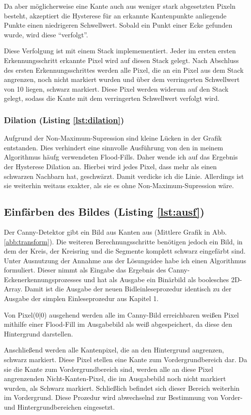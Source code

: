 Da aber möglicherweise eine Kante auch aus weniger stark abgesetzten Pixeln besteht, akzeptiert die Hysterese für an erkannte Kantenpunkte anliegende Punkte einen niedrigeren Schwellwert. Sobald ein Punkt einer Ecke gefunden wurde, wird diese "`verfolgt"'.

Diese Verfolgung ist mit einem Stack implemementiert. Jeder im ersten ersten Erkennungsschritt erkannte Pixel wird auf diesen Stack gelegt. Nach Abschluss des ersten Erkennungsschrittes werden alle Pixel, die an ein Pixel aus dem Stack angrenzen, noch nicht markiert wurden und über dem verringerten Schwellwert von 10 liegen, schwarz markiert. Diese Pixel werden widerum auf den Stack gelegt, sodass die Kante mit dem verringerten Schwellwert verfolgt wird. 

\subsubsection{Dilation (Listing \ref{lst:dilation})}
Aufgrund der Non-Maximum-Supression sind kleine Lücken in der Grafik entstanden. Dies verhindert eine sinnvolle Ausführung von den in meinem Algorithmus häufg verwendeten Flood-Fills. Daher wende ich auf das Ergebnis der Hysterese Dilation an. Hierbei wird jedes Pixel, dass mehr als einen schwarzen Nachbarn hat, geschwärzt.
Damit verdicke ich die Linie. Allerdings ist sie weiterhin weitaus exakter, als sie es ohne Non-Maximum-Supression wäre.

\subsection{Einfärben des Bildes (Listing \ref{lst:ausf})}
Der Canny-Detektor gibt ein Bild aus Kanten aus (Mittlere Grafik in Abb. \ref{abb:transform}). Die weiteren Berechnungsschritte benötigen jedoch ein Bild, in dem der Kreis, der Kreisring und die Segmente komplett schwarz eingefärbt sind. Unter Ausnutzung der Annahme aus der Lösungsidee habe ich einen Algorithmus formuliert.
Dieser nimmt als Eingabe das Ergebnis des Canny-Eckenerkennungsprozesses und hat als Ausgabe ein Binärbild als boolesches 2D-Array. Damit ist die Ausgabe der neuen Bidleinleseprozedur identisch zu der Ausgabe der simplen Einleseprozedur aus Kapitel 1.

Von Pixel(0|0) ausgehend werden alle im Canny-Bild erreichbaren weißen Pixel mithilfe einer Flood-Fill im Ausgabebild als weiß abgespeichert, da diese den Hintergrund darstellen.

Anschließend werden alle Kantenpixel, die an den Hintergrund angrenzen, schwarz markiert. Diese Pixel stellen eine Kante zum Vordergrundbereich dar.
Da sie die Kante zum Vordergrundbereich sind, werden alle an diese Pixel angrenzenden Nicht-Kanten-Pixel, die im Ausgabebild noch nicht markiert wurden, als Schwarz markiert. Schließlich befindet sich dieser Bereich weiterhin im Vordergrund.
Diese Prozedur wird abwechselnd zur Bestimmung von Vorder- und Hintergrundbereichen eingesetzt.

